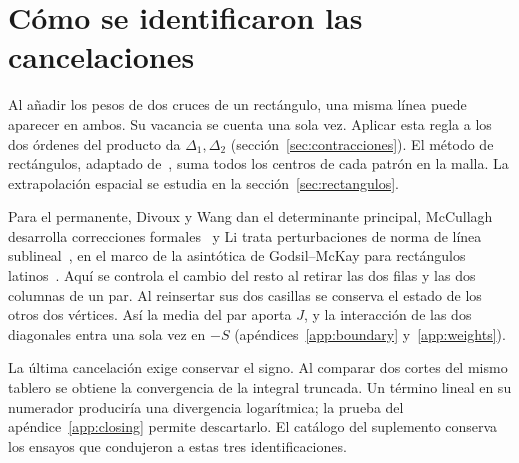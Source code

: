 \section{Cómo se identificaron las cancelaciones}\label{sec:cancelaciones}
Al añadir los pesos de dos cruces de un rectángulo, una misma línea puede aparecer en ambos.
Su vacancia se cuenta una sola vez. Aplicar esta regla a los dos órdenes del producto da
\(\Delta_1,\Delta_2\) (sección~\ref{sec:contracciones}). El método de rectángulos, adaptado
de~\cite[\S4]{tc}, suma todos los centros de cada patrón en la malla. La extrapolación espacial
se estudia en la sección~\ref{sec:rectangulos}.

Para el permanente, Divoux y Wang dan el determinante principal, McCullagh desarrolla
correcciones formales~\cite{dw,mcc} y Li trata perturbaciones de norma de línea
sublineal~\cite{li}, en el marco de la asintótica de Godsil--McKay para rectángulos latinos~\cite{gm}.
Aquí se controla el cambio del resto al retirar las dos filas y las dos columnas de un par.
Al reinsertar sus dos casillas se conserva el estado de los otros dos vértices. Así la media
del par aporta \(J\), y la interacción de las dos diagonales entra una sola vez en \(-S\)
(apéndices~\ref{app:boundary} y~\ref{app:weights}).

La última cancelación exige conservar el signo. Al comparar dos cortes del mismo tablero se
obtiene la convergencia de la integral truncada. Un término lineal en su numerador produciría
una divergencia logarítmica; la prueba del apéndice~\ref{app:closing} permite descartarlo.
El catálogo del suplemento conserva los ensayos que condujeron a estas tres identificaciones.
